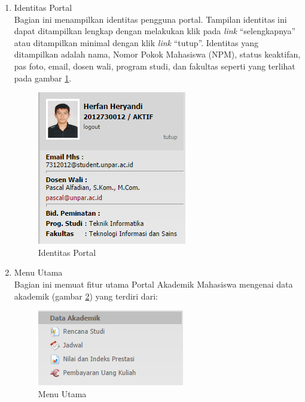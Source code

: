 \begin{enumerate}
	\item Identitas Portal \\
	Bagian ini menampilkan identitas pengguna portal. Tampilan identitas ini dapat ditampilkan lengkap dengan melakukan klik pada \textit{link} ``selengkapnya'' atau ditampilkan minimal dengan klik \textit{link} ``tutup''. Identitas yang ditampilkan adalah nama, Nomor Pokok Mahasiswa (NPM), status keaktifan, pas foto, email, dosen wali, program studi, dan fakultas seperti yang terlihat pada gambar \ref{fig:3_pam_identitas}.   
	\begin{figure}[H]
			\centering
			\includegraphics[scale=0.75]{Gambar/pam-identitas}
			\caption{Identitas Portal} 
			\label{fig:3_pam_identitas}
		\end{figure}
		
	\item Menu Utama\\
	Bagian ini memuat fitur utama Portal Akademik Mahasiswa mengenai data akademik (gambar \ref{fig:3_pam_utama}) yang terdiri dari:
		\begin{figure}[H]
			\centering
			\includegraphics[scale=0.75]{Gambar/pam-utama}
			\caption{Menu Utama} 
			\label{fig:3_pam_utama}
		\end{figure}
	\begin{itemize}
	

\end{itemize}
\end{enumerate}
